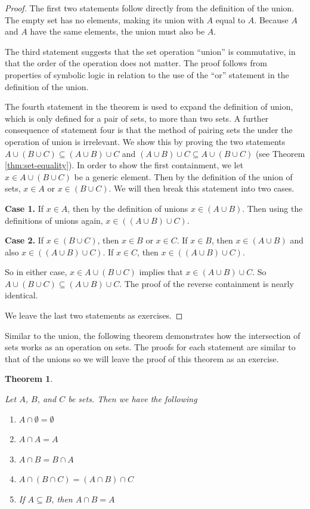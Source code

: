 \documentclass[
]{book}
\newtheorem{theorem}{Theorem}[chapter]
\theoremstyle{definition}
\theoremstyle{definition}
\theoremstyle{definition}
\theoremstyle{definition}
\theoremstyle{remark}
\begin{document}
\begin{proof}
The first two statements follow directly from the definition of the union. The empty set has no elements, making its union with \(A\) equal to \(A\). Because \(A\) and \(A\) have the same elements, the union must also be \(A\).

The third statement suggests that the set operation ``union'' is commutative, in that the order of the operation does not matter. The proof follows from properties of symbolic logic in relation to the use of the ``or'' statement in the definition of the union.

The fourth statement in the theorem is used to expand the definition of union, which is only defined for a pair of sets, to more than two sets. A further consequence of statement four is that the method of pairing sets the under the operation of union is irrelevant. We show this by proving the two statements \(A \cup (B\cup C ) \subseteq (A\cup B) \cup C\) and \((A\cup B) \cup C \subseteq A \cup (B\cup C)\) (see Theorem \ref{thm:set-equality}). In order to show the first containment, we let \(x\in A \cup (B\cup C )\) be a generic element. Then by the definition of the union of sets, \(x\in A\) or \(x\in (B\cup C)\). We will then break this statement into two cases.

\textbf{Case 1.} If \(x\in A\), then by the definition of unions \(x\in (A \cup B)\). Then using the definitions of unions again, \(x \in ((A \cup B) \cup C)\).

\textbf{Case 2.} If \(x\in (B\cup C)\), then \(x\in B\) or \(x\in C\). If \(x\in B\), then \(x\in (A\cup B)\) and also \(x\in ((A\cup B) \cup C)\). If \(x\in C\), then \(x\in ((A\cup B) \cup C)\).

So in either case, \(x \in A \cup (B\cup C)\) implies that \(x\in (A\cup B) \cup C\). So \(A\cup (B\cup C) \subseteq (A\cup B)\cup C\). The proof of the reverse containment is nearly identical.

We leave the last two statements as exercises.
\end{proof}

Similar to the union, the following theorem demonstrates how the intersection of sets works as an operation on sets. The proofs for each statement are similar to that of the unions so we will leave the proof of this theorem as an exercise.

\begin{theorem}
\protect\hypertarget{thm:intersections}{}\label{thm:intersections}

Let \(A\), \(B\), and \(C\) be sets. Then we have the following

\begin{enumerate}
\def\labelenumi{\arabic{enumi}.}
\item
  \(A\cap \emptyset = \emptyset\)
\item
  \(A \cap A = A\)
\item
  \(A \cap B = B \cap A\)
\item
  \(A \cap (B\cap C ) = (A\cap B) \cap C\)
\item
  If \(A \subseteq B\), then \(A \cap B = A\)
\end{enumerate}

\end{theorem}
\end{document}
